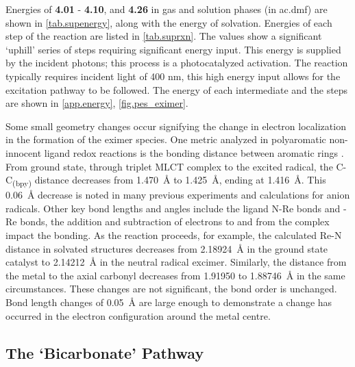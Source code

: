 Energies of \textbf{4.01} - \textbf{4.10}, and \textbf{4.26} in gas and solution phases (in \gls{ac.dmf}) are shown in \autoref{tab.supenergy}, along with the energy of solvation. Energies of each step of the reaction are listed in \autoref{tab.suprxn}. The values show a significant `uphill' series of steps requiring significant energy input. This energy is supplied by the incident photons; this process is a photocatalyzed activation. The reaction typically requires incident light of 400 nm\autocite{hawecker1983}, this high energy input allows for the excitation pathway to be followed. The energy of each intermediate and the steps are shown in \autoref{app.energy}, \autoref{fig.pes_eximer}.




Some small geometry changes occur signifying the change in electron localization in the formation of the eximer species. One metric analyzed in polyaromatic non-innocent ligand redox reactions is the bonding distance between aromatic rings \autocite{bokarev2014}. From ground state, through triplet MLCT complex to the excited radical, the C-C\textsubscript{(bpy)} distance decreases from 1.470~\r{A} to 1.425~\r{A}, ending at 1.416~\r{A}. This 0.06~\r{A} decrease is noted in many previous experiments and calculations for anion radicals\autocite{bokarev2014, chisholm1981, castellaventura2000, gorerandall2009, irwin2010}. Other key bond lengths and angles include the ligand N-Re bonds and -Re bonds, the addition and subtraction of electrons to and from the complex impact the bonding. As the reaction proceeds, for example, the calculated Re-N distance in solvated structures decreases from 2.18924~\r{A} in the ground state catalyst to 2.14212~\r{A} in the neutral radical excimer. Similarly, the distance from the metal to the axial carbonyl decreases from 1.91950 to 1.88746~\r{A} in the same circumstances. These changes are not significant, the bond order is unchanged. Bond length changes of 0.05~\r{A} are large enough to demonstrate a change has occurred in the electron configuration around the metal centre. 

\subsection{The `Bicarbonate' Pathway}\label{ss.carbonate}

